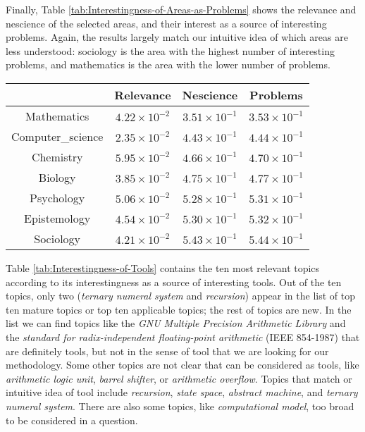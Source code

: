Finally, Table \ref{tab:Interestingness-of-Areas-as-Problems} shows the relevance and nescience of the selected areas, and their interest as a source of interesting problems. Again, the results largely match
our intuitive idea of which areas are less understood: sociology is the area with the highest number of interesting problems, and mathematics is the area with the lower number of problems.

\begin{table*}
\begin{centering}
\begin{tabular}{|c|c|c|c|}
\hline 
 & Relevance & Nescience & Problems\tabularnewline
\hline 
\hline 
Mathematics & $4.22\times10^{-2}$ & $3.51\times10^{-1}$ & $3.53\times10^{-1}$\tabularnewline
\hline 
Computer\_science & $2.35\times10^{-2}$ & $4.43\times10^{-1}$ & $4.44\times10^{-1}$\tabularnewline
\hline 
Chemistry & $5.95\times10^{-2}$ & $4.66\times10^{-1}$ & $4.70\times10^{-1}$\tabularnewline
\hline 
Biology & $3.85\times10^{-2}$ & $4.75\times10^{-1}$ & $4.77\times10^{-1}$\tabularnewline
\hline 
Psychology & $5.06\times10^{-2}$ & $5.28\times10^{-1}$ & $5.31\times10^{-1}$\tabularnewline
\hline 
Epistemology & $4.54\times10^{-2}$ & $5.30\times10^{-1}$ & $5.32\times10^{-1}$\tabularnewline
\hline 
Sociology & $4.21\times10^{-2}$ & $5.43\times10^{-1}$ & $5.44\times10^{-1}$\tabularnewline
\hline 
\end{tabular}
\par\end{centering}

\caption{\label{tab:Interestingness-of-Areas-as-Problems}Interestingness of Areas as Problems}
\end{table*}


Table \ref{tab:Interestingness-of-Tools} contains the ten most relevant
topics according to its interestingness as a source of interesting
tools. Out of the ten topics, only two (\emph{ternary numeral system}
and \emph{recursion}) appear in the list of top ten mature topics
or top ten applicable topics; the rest of topics are new. In the list
we can find topics like the \emph{GNU Multiple Precision Arithmetic
Library} and the \emph{standard for radix-independent floating-point
arithmetic} (IEEE 854-1987) that are definitely tools, but not in
the sense of tool that we are looking for our methodology. Some other
topics are not clear that can be considered as tools, like \emph{arithmetic
logic unit}, \emph{barrel shifter}, or \emph{arithmetic overflow}.
Topics that match or intuitive idea of tool include \emph{recursion},
\emph{state space}, \emph{abstract machine}, and \emph{ternary numeral
system}. There are also some topics, like \emph{computational model},
too broad to be considered in a question.

